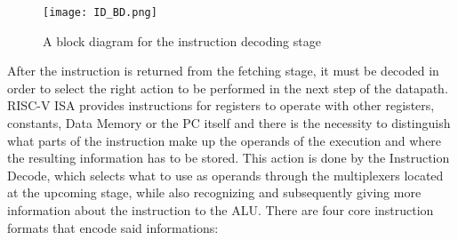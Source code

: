 \begin{figure}[ht!]
  \centering
  \texttt{[image: ID\_BD.png]}
  \caption{A block diagram for the instruction decoding stage}
  \label{fig:ID_BD}
\end{figure}

After the instruction is returned from the fetching stage, it must be decoded in order to select the right action to be performed in the next step of the datapath. RISC-V ISA provides instructions for registers to operate with other registers, constants, Data Memory or the PC itself and there is the necessity to distinguish what parts of the instruction make up the operands of the execution and where the resulting information has to be stored.
This action is done by the Instruction Decode, which selects what to use as operands through the multiplexers located at the upcoming stage, while also recognizing and subsequently giving more information about the instruction to the ALU.
There are four core instruction formats that encode said informations:
